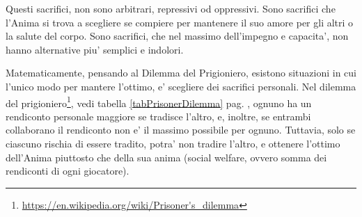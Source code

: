 Questi sacrifici, non sono arbitrari, repressivi od oppressivi. Sono sacrifici che l'Anima si trova a scegliere se compiere per mantenere il suo amore per gli altri o la salute del corpo. Sono sacrifici, che nel massimo dell'impegno e capacita', non hanno alternative piu' semplici e indolori.

Matematicamente, pensando al Dilemma del Prigioniero, esistono situazioni in cui l'unico modo per mantere l'ottimo, e' scegliere dei sacrifici personali. Nel dilemma del prigioniero\footnote{\url{https://en.wikipedia.org/wiki/Prisoner's\_dilemma}}, vedi tabella \ref{tabPrisonerDilemma} pag. \pageref{tabPrisonerDilemma}, ognuno ha un rendiconto personale maggiore se tradisce l'altro, e, inoltre, se entrambi collaborano il rendiconto non e' il massimo possibile per ognuno. Tuttavia, solo se ciascuno rischia di essere tradito, potra' non tradire l'altro, e ottenere l'ottimo dell'Anima piuttosto che della sua anima (social welfare, ovvero somma dei rendiconti di ogni giocatore).

